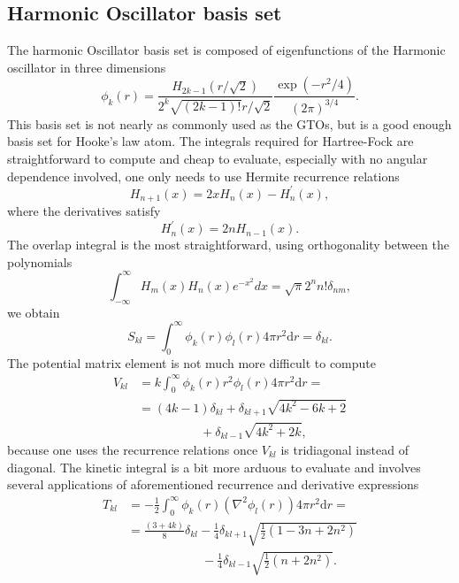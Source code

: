 \documentclass[final,3p,times,twocolumn]{elsarticle}
\begin{document}
	\subsection{Harmonic Oscillator basis set}
	The harmonic Oscillator basis set is composed of eigenfunctions of the Harmonic oscillator in three dimensions
	\begin{equation}
			\phi_{k}(r)=\frac{H_{2 k-1}(r / \sqrt{2})}{2^{k} \sqrt{(2 k-1) !} r / \sqrt{2}} \frac{\exp \left(-r^{2} / 4\right)}{(2 \pi)^{3 / 4}}.
	\end{equation}
	This basis set is not nearly as commonly used as the GTOs, but is a good enough basis set for Hooke's law atom. The integrals required for Hartree-Fock are straightforward to compute and cheap to evaluate, especially with no angular dependence involved, one only needs to use Hermite recurrence relations
	\begin{equation}
		H_{n+1}(x)=2 x H_{n}(x)-H_{n}^{\prime}(x),
	\end{equation} 
	where the derivatives satisfy
	\begin{equation}
		H_{n}^{\prime}(x)=2 n H_{n-1}(x).
	\end{equation}
	The overlap integral is the most straightforward, using orthogonality between the polynomials
	\begin{equation}
		\int_{-\infty}^{\infty} H_{m}(x) H_{n}(x) e^{-x^{2}} d x=\sqrt{\pi} 2^{n} n ! \delta_{n m},
	\end{equation}
	we obtain
	\begin{equation}
		S_{kl}=\int_{0}^{\infty} \phi_{k}(r) \phi_{l}(r) 4\pi r^2 \mathrm{d} r= \delta_{kl}.
	\end{equation}
	The potential matrix element is not much more difficult to compute
	\begin{equation}
		\begin{aligned}
			V_{kl} &=k \int_{0}^{\infty} \phi_{k}(r) r^2 \phi_{l}(r) 4\pi r^2 \mathrm{d} r = \\
				   &=(4k-1) \delta_{kl} + \delta_{kl+1}\sqrt{4k^2-6k+2} \\
				   &\qquad\qquad\quad+\delta_{kl-1}\sqrt{4k^2+2k},
		\end{aligned}
	\end{equation}
	because one uses the recurrence relations once $V_{kl}$ is tridiagonal instead of diagonal. The kinetic integral is a bit more arduous to evaluate and involves several applications of aforementioned recurrence and derivative expressions
	\begin{equation}
		\begin{aligned}
			T_{kl} &= -\frac{1}{2} \int_{0}^{\infty} \phi_{k}(r) \left(\nabla^2 \phi_{l}(r)\right) 4\pi r^2 \mathrm{d} r = \\
			&=\frac{(3+4k)}{8} \delta_{kl} - \frac{1}{4}\delta_{kl+1}\sqrt{\frac{1}{2}(1-3n+2n^2)} \\
			&\qquad\qquad\qquad-\frac{1}{4}\delta_{kl-1}\sqrt{\frac{1}{2}(n+2n^2)}.
		\end{aligned}
	\end{equation}
\end{document}

